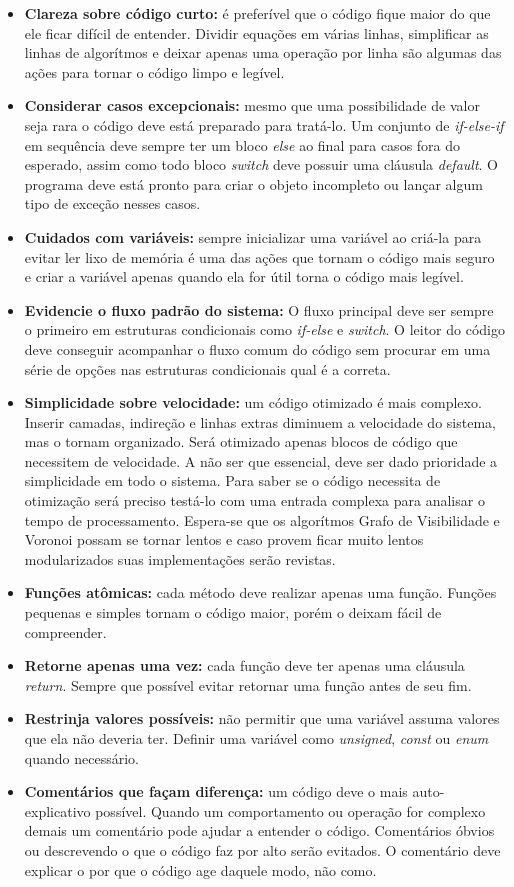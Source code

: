 \begin{itemize}
  \item \textbf{Clareza sobre código curto:} é preferível que o código fique maior do que ele ficar difícil de entender. Dividir equações em várias linhas, simplificar as linhas de algorítmos e deixar apenas uma operação por linha são algumas das ações para tornar o código limpo e legível.
  \item \textbf{Considerar casos excepcionais:} mesmo que uma possibilidade de valor seja rara o código deve está preparado para tratá-lo. Um conjunto de \textit{if-else-if} em sequência deve sempre ter um bloco \textit{else} ao final para casos fora do esperado, assim como todo bloco \textit{switch} deve possuir uma cláusula \textit{default}. O programa deve está pronto para criar o objeto incompleto ou lançar algum tipo de exceção nesses casos.
  \item \textbf{Cuidados com variáveis:} sempre inicializar uma variável ao criá-la para evitar ler lixo de memória é uma das ações que tornam o código mais seguro e criar a variável apenas quando ela for útil torna o código mais legível.
  \item \textbf{Evidencie o fluxo padrão do sistema:} O fluxo principal deve ser sempre o primeiro em estruturas condicionais como \textit{if-else} e \textit{switch}. O leitor do código deve conseguir acompanhar o fluxo comum do código sem procurar em uma série de opções nas estruturas condicionais qual é a correta.
  \item \textbf{Simplicidade sobre velocidade:} um código otimizado é mais complexo. Inserir camadas, indireção e linhas extras diminuem a velocidade do sistema, mas o tornam organizado. Será otimizado apenas blocos de código que necessitem de velocidade. A não ser que essencial, deve ser dado prioridade a simplicidade em todo o sistema. Para saber se o código necessita de otimização será preciso testá-lo com uma entrada complexa para analisar o tempo de processamento. Espera-se que os algorítmos Grafo de Visibilidade e Voronoi possam se tornar lentos e caso provem ficar muito lentos modularizados suas implementações serão revistas.
  \item \textbf{Funções atômicas:} cada método deve realizar apenas uma função. Funções pequenas e simples tornam o código maior, porém o deixam fácil de compreender.
  \item \textbf{Retorne apenas uma vez:} cada função deve ter apenas uma cláusula \textit{return}. Sempre que possível evitar retornar uma função antes de seu fim.
  \item \textbf{Restrinja valores possíveis:} não permitir que uma variável assuma valores que ela não deveria ter. Definir uma variável como \textit{unsigned}, \textit{const} ou \textit{enum} quando necessário.
  \item \textbf{Comentários que façam diferença:} um código deve o mais auto-explicativo possível. Quando um comportamento ou operação for complexo demais um comentário pode ajudar a entender o código. Comentários óbvios ou descrevendo o que o código faz por alto serão evitados. O comentário deve explicar o por que o código age daquele modo, não como.
\end{itemize} 

